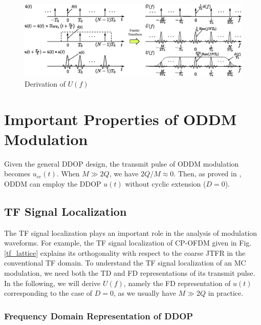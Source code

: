 \documentclass[journal]{IEEEtran}
\begin{document}
\begin{figure}
  \centering
  \includegraphics[width=17cm]{utuf}
  \caption{Derivation of $U(f)$}
  \label{derivation_uf}
\end{figure}

\section{Important Properties of ODDM Modulation}
Given the general DDOP design, the transmit pulse of ODDM modulation becomes $u_{ce}(t)$.  When $M\gg 2Q$, we have  $2Q/M\approx 0$. Then, as proved in \cite{oddmicc22}, ODDM can employ the DDOP $u(t)$ without cyclic extension ($D=0$).



\subsection{TF Signal Localization}
The TF signal localization plays an important role in the analysis of modulation waveforms.
For example, the TF signal localization of CP-OFDM given in Fig. \ref{tf_lattice} explains its orthogonality with respect to the coarse JTFR in the conventional TF domain.
To understand the TF signal localization of an MC modulation, we need both the TD and FD representations of its transmit pulse.
In the following, we will derive $U(f)$, namely the FD representation of $u(t)$ corresponding to the case of $D=0$, as we usually have $M\gg 2Q$ in practice.



\subsubsection{Frequency Domain Representation of DDOP}
\end{document}
